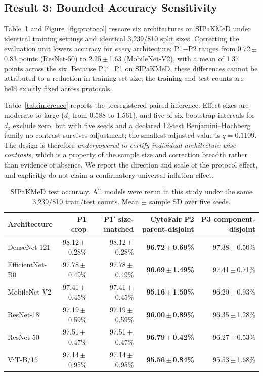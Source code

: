 \documentclass[conference]{IEEEtran}
\newcommand{\meanpm}[2]{#1\,$\pm$\,#2}
\newcommand{\protocol}[1]{\textsf{#1}}
\newcommand{\cytofair}{CytoFair}
\begin{document}
\subsection{Result 3: Bounded Accuracy Sensitivity}
Table~\ref{tab:classification} and Figure~\ref{fig:protocol} rescore six architectures on SIPaKMeD under identical training settings and identical 3,239/810 split sizes.
Correcting the evaluation unit lowers accuracy for \emph{every} architecture: \protocol{P1}$-$\protocol{P2} ranges from \meanpm{0.72}{0.83} points (ResNet-50) to \meanpm{2.25}{1.63} (MobileNet-V2), with a mean of 1.37 points across the six.
Because \protocol{P1$'$}=\protocol{P1} on SIPaKMeD, these differences cannot be attributed to a reduction in training-set size; the training and test counts are held exactly fixed across protocols.

Table~\ref{tab:inference} reports the preregistered paired inference.
Effect sizes are moderate to large ($d_z$ from 0.588 to 1.561), and five of six bootstrap intervals for $d_z$ exclude zero, but with five seeds and a declared 12-test Benjamini--Hochberg family no contrast survives adjustment; the smallest adjusted value is $q=0.1109$.
The design is therefore \emph{underpowered to certify individual architecture-wise contrasts}, which is a property of the sample size and correction breadth rather than evidence of absence.
We report the direction and scale of the protocol effect, and explicitly do not claim a confirmatory universal inflation effect.

\begin{table}[t]
\caption{SIPaKMeD test accuracy. All models were rerun in this study under the same 3,239/810 train/test counts. Mean $\pm$ sample SD over five seeds.}
\label{tab:classification}
\centering
\scriptsize
\setlength{\tabcolsep}{7pt}
\begin{tabular}{lrrrr}
\toprule
Architecture & \protocol{P1} crop & \protocol{P1$'$} size-matched & \textbf{\cytofair{} \protocol{P2} parent-disjoint} & \protocol{P3} component-disjoint \\
\midrule
DenseNet-121 & \meanpm{98.12}{0.28}\% & \meanpm{98.12}{0.28}\% & \textbf{\meanpm{96.72}{0.69}\%} & \meanpm{97.38}{0.50}\% \\
EfficientNet-B0 & \meanpm{97.78}{0.49}\% & \meanpm{97.78}{0.49}\% & \textbf{\meanpm{96.69}{1.49}\%} & \meanpm{97.41}{0.71}\% \\
MobileNet-V2 & \meanpm{97.41}{0.45}\% & \meanpm{97.41}{0.45}\% & \textbf{\meanpm{95.16}{1.50}\%} & \meanpm{96.20}{0.93}\% \\
ResNet-18 & \meanpm{97.19}{0.59}\% & \meanpm{97.19}{0.59}\% & \textbf{\meanpm{96.00}{0.89}\%} & \meanpm{96.35}{1.28}\% \\
ResNet-50 & \meanpm{97.51}{0.47}\% & \meanpm{97.51}{0.47}\% & \textbf{\meanpm{96.79}{0.42}\%} & \meanpm{96.27}{0.53}\% \\
ViT-B/16 & \meanpm{97.14}{0.95}\% & \meanpm{97.14}{0.95}\% & \textbf{\meanpm{95.56}{0.84}\%} & \meanpm{95.53}{1.68}\% \\
\bottomrule
\end{tabular}
\end{table}
\end{document}
